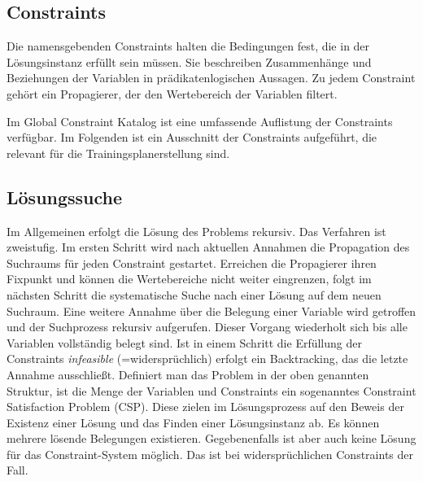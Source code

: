 \subsection{Constraints}
Die namensgebenden Constraints halten die Bedingungen fest, die in der Lösungsinstanz erfüllt sein müssen. Sie beschreiben Zusammenhänge und Beziehungen der Variablen in prädikatenlogischen Aussagen.  Zu jedem Constraint gehört ein Propagierer, der den Wertebereich der Variablen filtert.

Im Global Constraint Katalog \cite{GlobalConstraintWeb}  ist eine umfassende Auflistung der Constraints verfügbar. Im Folgenden ist ein Ausschnitt der Constraints aufgeführt, die relevant für die Trainingsplanerstellung sind.

\subsection{Lösungssuche}
Im Allgemeinen erfolgt die Lösung des Problems rekursiv. Das Verfahren ist zweistufig. Im ersten Schritt wird nach aktuellen Annahmen die Propagation des Suchraums für jeden Constraint gestartet. Erreichen die Propagierer ihren Fixpunkt und können die Wertebereiche nicht weiter eingrenzen, folgt im nächsten Schritt die systematische Suche nach einer Lösung auf dem neuen Suchraum. Eine weitere Annahme über die Belegung einer Variable wird getroffen und der Suchprozess rekursiv aufgerufen. Dieser Vorgang wiederholt sich bis alle Variablen vollständig belegt sind. Ist in einem Schritt die Erfüllung der Constraints \textit{infeasible} (=widersprüchlich) erfolgt ein Backtracking, das die letzte Annahme ausschließt.
Definiert man das Problem in der oben genannten Struktur, ist die Menge der Variablen und Constraints ein sogenanntes Constraint Satisfaction Problem (CSP). Diese zielen im Lösungsprozess auf den Beweis der Existenz einer Lösung und das Finden einer Lösungsinstanz ab. Es können mehrere lösende Belegungen existieren. Gegebenenfalls ist aber auch keine Lösung für das Constraint-System möglich. Das ist bei widersprüchlichen Constraints der Fall. 
